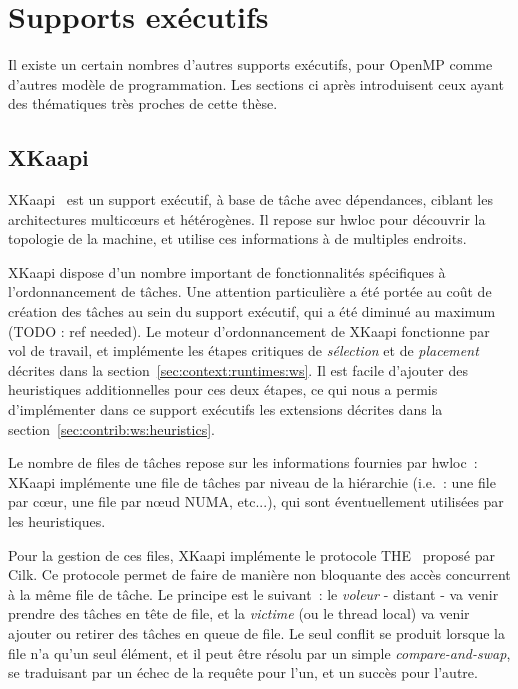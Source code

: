 \section{Supports exécutifs}\label{sec:rw:other-runtimes}

Il existe un certain nombres d'autres supports exécutifs, pour OpenMP comme d'autres modèle de programmation.
Les sections ci après introduisent ceux ayant des thématiques très proches de cette thèse.

\subsection{XKaapi}

XKaapi~\cite{Gautier2007} est un support exécutif, à base de tâche avec dépendances, ciblant les architectures multicœurs et hétérogènes.
Il repose sur hwloc pour découvrir la topologie de la machine, et utilise ces informations à de multiples endroits.

XKaapi dispose d'un nombre important de fonctionnalités spécifiques à l'ordonnancement de tâches.
Une attention particulière a été portée au coût de création des tâches au sein du support exécutif, qui a été diminué au maximum (TODO : ref needed).
Le moteur d'ordonnancement de XKaapi fonctionne par vol de travail, et implémente les étapes critiques de \emph{sélection} et de \emph{placement} décrites dans la section~\ref{sec:context:runtimes:ws}. Il est facile d'ajouter des heuristiques additionnelles pour ces deux étapes, ce qui nous a permis d'implémenter dans ce support exécutifs les extensions décrites dans la section~\ref{sec:contrib:ws:heuristics}.

Le nombre de files de tâches repose sur les informations fournies par hwloc~: XKaapi implémente une file de tâches par niveau de la hiérarchie (i.e.~: une file par cœur, une file par nœud NUMA, etc...), qui sont éventuellement utilisées par les heuristiques.

Pour la gestion de ces files, XKaapi implémente le protocole THE~\cite{cilk5} proposé par Cilk. Ce protocole permet de faire de manière non bloquante des accès concurrent à la même file de tâche. Le principe est le suivant~: le \emph{voleur} - distant - va venir prendre des tâches en tête de file, et la \emph{victime} (ou le thread local) va venir ajouter ou retirer des tâches en queue de file.
Le seul conflit se produit lorsque la file n'a qu'un seul élément, et il peut être résolu par un simple \emph{compare-and-swap}, se traduisant par un échec de la requête pour l'un, et un succès pour l'autre.

